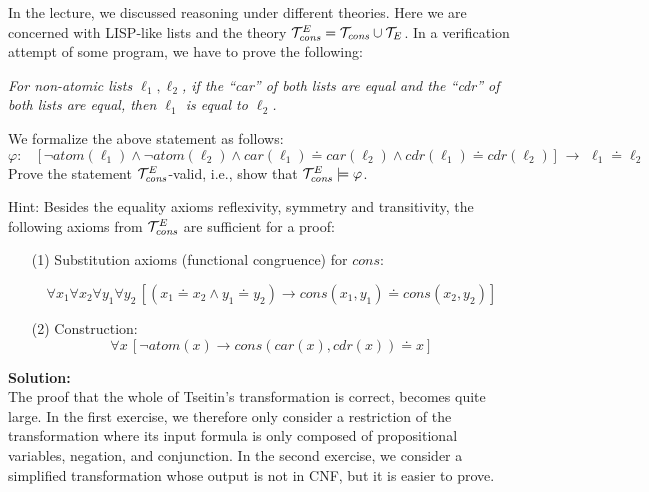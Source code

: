 \documentclass[11pt,a4paper]{uebung}
\newcommand{\solution}[1]{\par {\bf Solution:}\\#1}
\def\impl{\rightarrow}
\begin{document}
\newcommand{\semder}{\models}
In the lecture, we discussed reasoning under different theories. Here we are
concerned with LISP-like lists and the theory ${\cal T}_{\mathit{cons}}^E =
{\cal T}_{\mathit{cons}}\cup {\cal T}_E$.  In a verification attempt of some program,
we have to prove the following:
\begin{center}
\begin{minipage}{0.8\textwidth}
{\em For non-atomic lists $\ell_1, \ell_2$, if the ``car'' of both lists are
  equal and the ``cdr'' of both lists are equal, then $\ell_1$ is equal to
  $\ell_2$.  }
\end{minipage}
\end{center}
We formalize the above statement as follows:
$$ \varphi \colon \quad
\big[\, \neg \textit{atom}(\ell_1) \land \neg \textit{atom}(\ell_2) \land 
\textit{car}(\ell_1)  \doteq \textit{car}(\ell_2) \land  
\textit{cdr}(\ell_1) \doteq \textit{cdr}(\ell_2) \, \big] \,\, 
\impl \,\,  \ell_1 \doteq \ell_2  
$$
Prove the statement ${\cal T}_{\mathit{cons}}^E$-valid, i.e., show that
$\caT_{\mathit{cons}}^E \semder \varphi$.

\medskip

Hint: Besides the equality axioms reflexivity, symmetry and transitivity, the
following axioms from ${\cal T}_{\mathit{cons}}^E$ are sufficient for a proof:
\begin{itemize}

\item[(1)] Substitution axioms (functional congruence) for
  $\textit{cons}$: 

  $$\forall x_1\forall x_2 \forall y_1 \forall y_2 \, [
(x_1 \doteq x_2 \land y_1 \doteq y_2) \impl   
\textit{cons}(x_1,y_1) \doteq \textit{cons}(x_2,y_2)]$$
\item[(2)] Construction:
$$\forall x\, [\neg \textit{atom}(x) \impl 
\textit{cons}(\textit{car}(x), \textit{cdr}(x)) \doteq x] $$ 

\end{itemize}

\solution{
}


The proof that the whole of Tseitin's transformation is correct, becomes quite
large. In the first exercise, we therefore only consider a restriction of the
transformation where its input formula is only composed of propositional
variables, negation, and conjunction.
In the second exercise, we consider a simplified transformation whose output
is not in CNF, but it is easier to prove.
\end{document}
